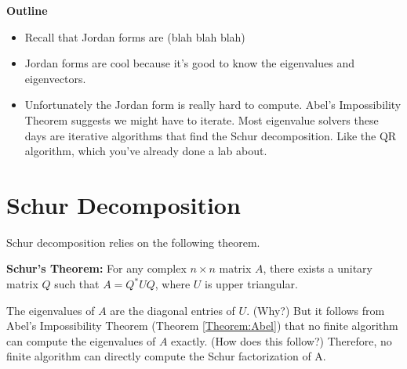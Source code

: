 \label{Ch:Jordan}



\textbf{Outline}
\begin{itemize}
	\item Recall that Jordan forms are (blah blah blah)
	\item Jordan forms are cool because it's good to know the eigenvalues and eigenvectors. 
	\item Unfortunately the Jordan form is really hard to compute. Abel's Impossibility Theorem suggests we might have to iterate. Most eigenvalue solvers these days are iterative algorithms that find the Schur decomposition. Like the QR algorithm, which you've already done a lab about.

\end{itemize}

\section*{Schur Decomposition}
Schur decomposition relies on the following theorem.


\begin{theorem}
{\bf Schur's Theorem:} For any complex $n \times n$ matrix $A$, there exists a unitary matrix $Q$ such that $A = Q^\ast U Q$, where $U$ is upper triangular.
\end{theorem}


The eigenvalues of $A$ are the diagonal entries of $U$. (Why?) But it follows from Abel's Impossibility Theorem (Theorem \ref{Theorem:Abel}) that no finite algorithm can compute the eigenvalues of $A$ exactly. (How does this follow?) Therefore, no finite algorithm can directly compute the Schur factorization of A.
